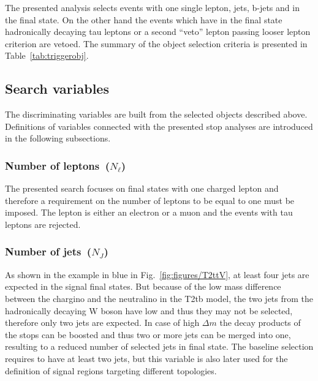 The presented analysis selects events with one single lepton, jets, b-jets and \MET in the final state. On the other hand the events which have in the final state hadronically decaying tau leptons or a second ``veto'' lepton passing looser lepton criterion are vetoed. The summary of the object selection criteria is presented in Table~\ref{tab:triggerobj}.

\subsection{Search variables~\label{sec:variables}}

The discriminating variables are built from the selected objects described above. Definitions of variables connected with the presented stop analyses are introduced in the following subsections.

\subsubsection{Number of leptons~($N_{\ell}$)}

The presented search focuses on final states with one charged lepton and therefore a requirement on the number of leptons to be equal to one must be imposed. The lepton is either an electron or a muon and the events with tau leptons are rejected.

\subsubsection{Number of jets~($N_{J}$)}

As shown in the example in blue in Fig.~\ref{fig:figures/T2ttV}, at least four jets are expected in the signal final states. But because of the low mass difference between the chargino and the neutralino in the T2tb model, the two jets from the hadronically decaying W boson have low \pt and thus they may not be selected, therefore only two jets are expected. In case of high $\Delta m$ the decay products of the stops can be boosted and thus two or more jets can be merged into one, resulting to a  reduced number of selected jets in final state. The baseline selection requires to have at least two jets, but this variable is also later used for the definition of signal regions targeting different topologies.


